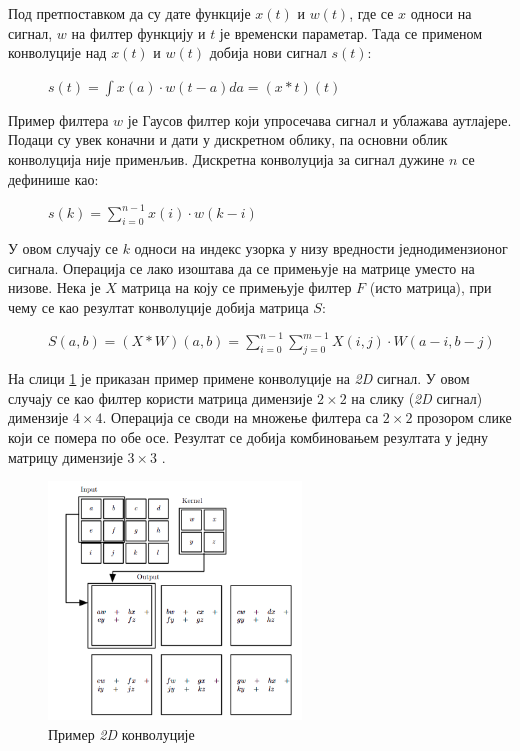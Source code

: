 \documentclass[11pt,oneside]{memoir}
\begin{document}
Под претпоставком да су дате функције $x(t)$ и $w(t)$, где се $x$ односи на сигнал, $w$ на филтер функцију и $t$ је временски параметар.
Тада се применом конволуције над $x(t)$ и $w(t)$ добија нови сигнал $s(t)$:

\begin{figure}[H]
  \centering
  $s(t) = \int x(a)\cdot w(t - a) da = (x*t)(t)$
\end{figure}

Пример филтера $w$ је Гаусов филтер који упросечава сигнал и ублажава аутлајере. Подаци су увек коначни и дати у дискретном облику, 
па основни облик конволуција није применљив. Дискретна конволуција за сигнал дужине $n$ се дефинише као:

\begin{figure}[H]
  \centering
  $s(k) = \sum_{i=0}^{n-1} x(i)\cdot w(k-i)$
\end{figure}

У овом случају се $k$ односи на индекс узорка у низу вредности једнодимензионог сигнала. 
Операција се лако изоштава да се примењује на матрице уместо на низове. Нека је $X$ матрица на коју се примењује филтер $F$ 
(исто матрица), при чему се као резултат конволуције добија матрица $S$:

\begin{figure}[H]
  \centering
  $S(a, b) = (X*W)(a, b) = \sum_{i=0}^{n-1} \sum_{j=0}^{m-1} X(i, j) \cdot W(a-i, b-j)$
\end{figure}

На слици \ref{convolution} је приказан пример примене конволуције на \textit{2D} сигнал. У овом случају се као филтер користи
матрица димензије $2\times 2$ на слику (\textit{2D} сигнал) димензије $4\times 4$. Операција се своди на множење 
филтера са $2\times 2$ прозором слике који се помера по обе осе. Резултат се добија комбиновањем резултата
у једну матрицу димензије $3\times 3$ \cite{deep_learning_goodfellow}.

\begin{figure}[H]
  \centering
  \includegraphics[width=0.6\textwidth]{images/convolution.png}
  \caption{Пример \textit{2D} конволуције\label{convolution}}
\end{figure}
\end{document}
